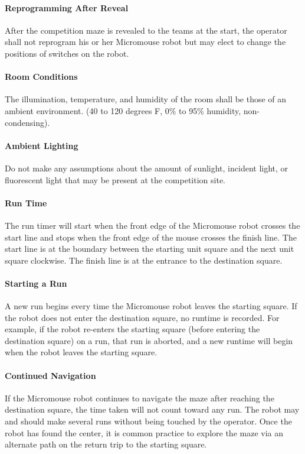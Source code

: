 \documentclass[12pt]{article}
\begin{document}
\paragraph{Reprogramming After Reveal}
After the competition \gls{maze} is revealed to the teams at the start, the
operator shall not reprogram his or her \gls{Micromouse} robot but may elect to change the
positions of switches on the robot.
\paragraph{Room Conditions}
The illumination, temperature, and humidity of the room shall be those of an ambient
environment. (40 to 120 degrees F, 0\% to 95\% humidity, non-condensing).
\paragraph{Ambient Lighting}
Do not make any assumptions about the amount of sunlight, incident light, or
fluorescent light that may be present at the competition site.
\paragraph{Run Time}
The run timer will start when the front edge of the \gls{Micromouse} robot crosses the start
line and stops when the front edge of the mouse crosses the finish line. The start line is
at the boundary between the starting unit square and the next unit square clockwise.
The finish line is at the entrance to the destination square.
\paragraph{Starting a Run}
A new run begins every time the \gls{Micromouse} robot leaves the starting square. If the
robot does not enter the destination square, no runtime is recorded. For example, if the
robot re-enters the starting square (before entering the destination square) on a run,
that run is aborted, and a new runtime will begin when the robot leaves the starting
square.
\paragraph{Continued Navigation}
If the \gls{Micromouse} robot continues to navigate the \gls{maze} after reaching the destination
square, the time taken will not count toward any run. The robot may and should make
several runs without being touched by the operator. Once the robot has found the
center, it is common practice to explore the \gls{maze} via an alternate path on the return
trip to the starting square.
\end{document}
